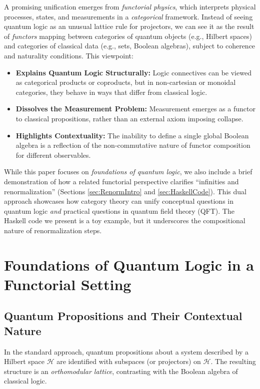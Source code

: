 \documentclass[12pt]{article}
\begin{document}
A promising unification emerges from \emph{functorial physics}, which interprets physical processes, states, and measurements in a \emph{categorical} framework. Instead of seeing quantum logic as an unusual lattice rule for projectors, we can see it as the result of \emph{functors} mapping between categories of quantum objects (e.g., Hilbert spaces) and categories of classical data (e.g., sets, Boolean algebras), subject to coherence and naturality conditions. This viewpoint:
\begin{itemize}[label=$\bullet$]
\item \textbf{Explains Quantum Logic Structurally:} Logic connectives can be viewed as categorical products or coproducts, but in non-cartesian or monoidal categories, they behave in ways that differ from classical logic.
\item \textbf{Dissolves the Measurement Problem:} Measurement emerges as a functor to classical propositions, rather than an external axiom imposing collapse.
\item \textbf{Highlights Contextuality:} The inability to define a single global Boolean algebra is a reflection of the non-commutative nature of functor composition for different observables.
\end{itemize}

While this paper focuses on \emph{foundations of quantum logic}, we also include a brief demonstration of how a related functorial perspective clarifies ``infinities and renormalization'' (Sections \ref{sec:RenormIntro} and \ref{sec:HaskellCode}). This dual approach showcases how category theory can unify conceptual questions in quantum logic \emph{and} practical questions in quantum field theory (QFT). The Haskell code we present is a toy example, but it underscores the compositional nature of renormalization steps.

\section{Foundations of Quantum Logic in a Functorial Setting}
\label{sec:FunctorialLogic}

\subsection{Quantum Propositions and Their Contextual Nature}
In the standard approach, quantum propositions about a system described by a Hilbert space $\mathcal{H}$ are identified with subspaces (or projectors) on $\mathcal{H}$. The resulting structure is an \emph{orthomodular lattice}, contrasting with the Boolean algebra of classical logic.
\end{document}
